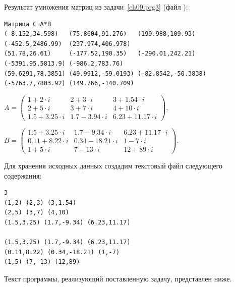 Результат умножения матриц из задачи~\ref{ch09:prg3} (файл ):

\begin{verbatim}
Матрица C=A*B
(-8.152,34.598)   (75.8604,91.276)   (199.988,109.93)    (-452.5,2486.99)  (237.974,406.978)
(51.78,26.61)     (-177.52,190.35)   (-290.01,242.21)    (-5391.95,5813.9) (-986.2,783.76)
(59.6291,78.3851) (49.9912,-59.0193) (-82.8542,-50.3838) (-5763.7,7803.92) (149.766,-140.709)
\end{verbatim}


 $A=\left(\begin{array}{rrr}1+2\cdot i&2+3\cdot i&3+1.54\cdot i\\2+5\cdot i&3+7\cdot i&4+10\cdot i\\1.5+3.25\cdot
i&1.7-3.94\cdot i&6.23+11.17\cdot i\end{array}\right)$,

 $B=\left(\begin{array}{rrr}1.5+3.25\cdot i&1.7-9.34\cdot i&6.23+11.17\cdot i\\0.11+8.22\cdot i&0.34-18.21\cdot i&1-7\cdot
i\\1+5\cdot i&7-13\cdot i&12+89\cdot i\end{array}\right)$.

Для хранения исходных данных создадим текстовый файл  %
следующего содержания:
\label{ch09:file1}\begin{verbatim}
3
(1,2) (2,3) (3,1.54)
(2,5) (3,7) (4,10)
(1.5,3.25) (1.7,-9.34) (6.23,11.17)

(1.5,3.25) (1.7,-9.34) (6.23,11.17)
(0.11,8.22) (0.34,-18.21) (1,-7)
(1,5) (7,-13) (12,89)
\end{verbatim}

Текст программы, реализующий поставленную задачу, представлен ниже. 

